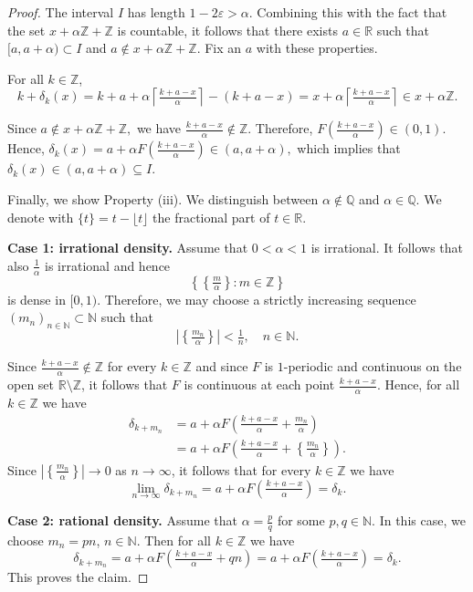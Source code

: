 \documentclass[reqno,a4paper,12pt]{amsart}
\numberwithin{equation}{section}
\def\N{{\mathbb N}}
\def\Z{{\mathbb Z}}
\def\R{{\mathbb R}}
\def\Q{{\mathbb Q}}
\newcommand\1{\mathds{1}}
\begin{document}
\begin{proof}
    The interval $I$ has length $1-2\varepsilon>\alpha$. Combining
    this with the fact that the set  $x+\alpha\Z+\Z$ is countable, it follows that there exists $a \in \R$ such that $[a,a+\alpha)\subset I$ and $a\notin x+\alpha\Z+\Z$. Fix an $a$ with these properties.

       For all $k\in\Z$,
    \begin{equation}
        k+\delta_k(x) = k+a+\alpha \left\lceil \tfrac{k+a-x}{\alpha}\right\rceil - (k+a-x) = x+ \alpha \left\lceil \tfrac{k+a-x}{\alpha}\right\rceil\in x+\alpha\Z.
    \end{equation}
    
Since
$
a\notin x+\alpha\mathbb Z+\mathbb Z,
$
we have $\frac{k+a-x}{\alpha}\notin\mathbb Z$. 
Therefore, $F(\frac{k+a-x}{\alpha})\in(0,1)$.
Hence, 
$
\delta_k(x)=a+\alpha F(\frac{k+a-x}{\alpha})\in(a,a+\alpha),
$
which implies that
$
\delta_k(x)\in (a,a+\alpha) \subseteq I.
$

Finally, we show Property (iii). We distinguish between $\alpha\notin\Q$ and $\alpha\in\Q$.
We denote with $\{ t\} = t-\lfloor t\rfloor$ the fractional part of $t\in\R$.

\textbf{Case 1: irrational density.} Assume that $0<\alpha<1$ is irrational. It follows that also $\frac1\alpha$ is irrational and hence
$$
\left\{\left\{ \tfrac{m}{\alpha} \right\} 
:m\in\Z\right\}
$$
is dense in $[0,1)$. Therefore, we may choose a strictly increasing
sequence $(m_n)_{n \in \N} \subset\mathbb N$ such that
\begin{equation}
   |\left\{\tfrac{m_n}{\alpha} \right\}|<\tfrac{1}{n}
   ,\quad n\in\N.
\end{equation}

Since $\frac{k+a-x}{\alpha}\notin\mathbb Z
$ for every $k \in \Z$ and since $F$ is $1$-periodic and continuous on the open set $\R\setminus\Z$, it follows that $F$ is continuous at each point $\frac{k+a-x}{\alpha}$. Hence, for all
$k\in\mathbb Z$ we have
\begin{align}
\delta_{k+m_n}
&=
a+\alpha F\left(\tfrac{k+a-x}{\alpha}+\tfrac{m_n}{\alpha}\right)\\
&=
a+\alpha F\left(\tfrac{k+a-x}{\alpha}+\left\{\tfrac{m_n}{\alpha} \right\}\right).
\end{align}
Since $|\left\{\tfrac{m_n}{\alpha} \right\}| \to 0$ as $n \to \infty$, it follows that for every $k \in \Z$ we have
$$
\lim_{n \to \infty} \delta_{k+m_n} = a+\alpha F\left(\tfrac{k+a-x}{\alpha}\right)
=
\delta_k .
$$

\textbf{Case 2: rational density.} 
Assume that $\alpha = \tfrac{p}{q}$ for some $p,q\in\N$. 
In  this case, we choose 
    $m_n = pn$, $n\in\N$. 
Then for all $k\in\Z$ we have 
\begin{equation}
    \delta_{k+m_n}
=
a+\alpha F\left(\tfrac{k+a-x}{\alpha}+qn\right) =
a+\alpha F\left(\tfrac{k+a-x}{\alpha}\right) = \delta_{k}.
\end{equation}
This proves the claim.
\end{proof}
\end{document}
